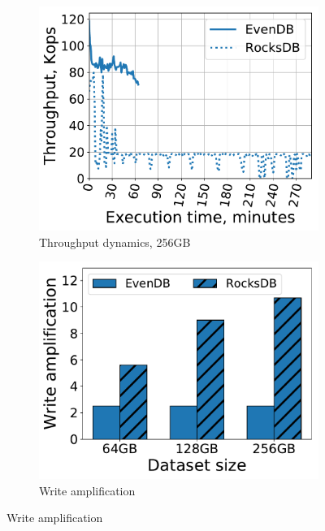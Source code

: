 \documentclass[sigplan,10pt]{acmart}
\providecommand{\DIFadd}[1]{{\protect\color{blue}\uwave{#1}}} %
\providecommand{\DIFaddFL}[1]{\DIFadd{#1}} %
\providecommand{\DIFaddbeginFL}{} %
\providecommand{\DIFaddendFL}{} %
\providecommand{\DIFdelbeginFL}{} %
\providecommand{\DIFdelendFL}{} %
\begin{document}
\begin{figure}[tb]
\begin{subfigure}{0.29\linewidth}
\DIFaddendFL \includegraphics[width=\textwidth]{figs/throughput_256_ingestions_line.pdf}
\caption{Throughput dynamics, 256GB}
\label{fig:prod:ingestion:b}
\end{subfigure}
\DIFdelbeginFL %
\DIFdelendFL \DIFaddbeginFL \DIFaddFL{\hspace{0.03\linewidth} 
}\begin{subfigure}{0.29\linewidth}
\DIFaddendFL \includegraphics[width=\textwidth]{figs/write_amp_256.pdf}
\caption{Write amplification}
\label{fig:prod:ingestion:c}
\end{subfigure}

\end{figure}
\end{document}
